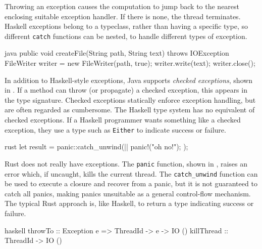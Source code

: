 Throwing an exception causes the computation to jump back to the
nearest enclosing suitable exception handler.  If there is none, the
thread terminates.  Haskell exceptions belong to a typeclass, rather
than having a specific type, so different \verb|catch| functions can
be nested, to handle different types of exception.

\begin{listing}
\centering
\begin{cminted}{java}
public void createFile(String path, String text) throws IOException {
  FileWriter writer = new FileWriter(path, true);
  writer.write(text);
  writer.close();
}
\end{cminted}
\caption{Checked exceptions in Java.}\label{lst:excs_java}
\end{listing}

In addition to Haskell-style exceptions, Java supports \emph{checked
  exceptions}, shown in .  If a method can throw
(or propagate) a checked exception, this appears in the type
signature.  Checked exceptions statically enforce exception handling,
but are often regarded as cumbersome.  The Haskell type system has no
equivalent of checked exceptions.  If a Haskell programmer wants
something like a checked exception, they use a type such as
\verb|Either| to indicate success or failure.

\begin{listing}
\centering
\begin{cminted}{rust}
let result = panic::catch_unwind(|| {
    panic!("oh no!");
});
\end{cminted}
\caption{Panics in Rust.}\label{lst:excs_rust}
\end{listing}

Rust does not really have exceptions.  The \verb|panic| function,
shown in , raises an error which, if uncaught,
kills the current thread.  The \verb|catch_unwind| function can be
used to execute a closure and recover from a panic, but it is not
guaranteed to catch all panics\cite{catch_unwind}, making panics
unsuitable as a general control-flow mechanism.  The typical Rust
approach is, like Haskell, to return a type indicating success or
failure.

\begin{listing}
\centering
\begin{cminted}{haskell}
throwTo    :: Exception e => ThreadId -> e -> IO ()
killThread :: ThreadId -> IO ()
\end{cminted}
\caption{Asynchronous exceptions in Haskell.}\label{lst:excsa_haskell}
\end{listing}

